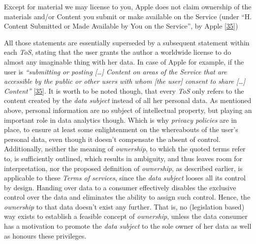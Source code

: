 \documentclass[12pt,english,a4paper,titlepage,cleardoublepage=empty,dottedtoc]{report}
\let\origquote\quote
\let\endorigquote\endquote
\renewenvironment{quote}{%
    \origquote
    \itshape
}
{\endorigquote}
\begin{document}
\begin{quote}
Except for material we may license to you, Apple does not claim
ownership of the materials and/or Content you submit or make available
on the Service (under ``H. Content Submitted or Made Available by You on
the Service'', by Apple
{[}\protect\hyperlink{ref-web_2016_apple-icloud_terms-of-service}{35}{]})
\end{quote}

All those statements are essentially superseded by a subsequent
statement within each \emph{ToS}, stating that the user grants the
author a worldwide license to do almost any imaginable thing with her
data. In case of Apple for example, if the user is \emph{``submitting or
posting {[}\ldots{}{]} Content on areas of the Service that are
accessible by the public or other users with whom {[}the user{]} consent
to share {[}\ldots{}{]} Content''}
{[}\protect\hyperlink{ref-web_2016_apple-icloud_terms-of-service}{35}{]}.
It is worth to be noted though, that every \emph{ToS} only refers to the
content created by the \emph{data subject} instead of all her personal
data. As mentioned above, personal information are no subject of
intellectual property, but playing an important role in data analytics
though. Which is why \emph{privacy policies} are in place, to ensure at
least some enlightenment on the whereabouts of the user's personal data,
even though it doesn't compensate the absent of control. Additionally,
neither the meaning of \emph{ownership}, to which the quoted terms refer
to, is sufficiently outlined, which results in ambiguity, and thus
leaves room for interpretation, nor the proposed definition of
\emph{ownership}, \protect\hypertarget{def--ownership}{}{as described
earlier}, is applicable to these \emph{Terms of services}, since the
\emph{data subject} looses all its control by design. Handing over data
to a consumer effectively disables the exclusive control over the data
and eliminates the ability to assign such control. Hence, the
\emph{ownership} to that data doesn't exist any further. That is, no
(legislation based) way exists to establish a feasible concept of
\emph{ownership}, unless the data consumer has a motivation to promote
the \emph{data subject} to the sole owner of her data as well as honours
these privileges.
\end{document}
